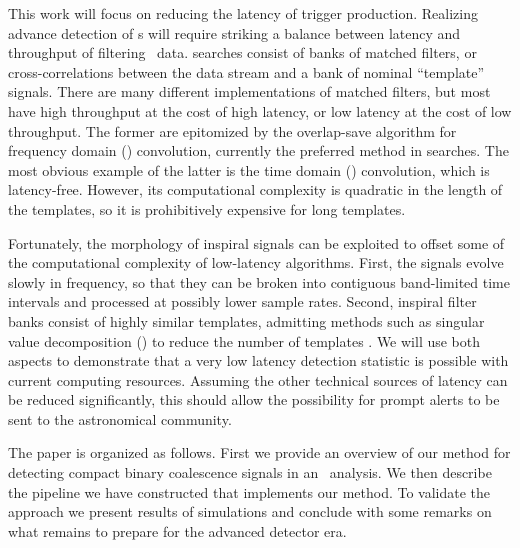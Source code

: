 This work will focus on reducing the latency of trigger production.  Realizing
advance detection of \CBC{}s will require striking a balance between latency
and throughput of filtering \GW\ data. \CBC{} searches consist of banks of
matched filters, or cross-correlations between the data stream and a bank of
nominal ``template'' signals.  There are many different implementations of
matched filters, but most have high throughput at the cost of high latency, or
low latency at the cost of low throughput.  The former are epitomized by the
overlap-save algorithm
for frequency domain (\FD) convolution, currently the preferred method in \GW{}
searches.  The most obvious example of the latter is the time domain (\TD)
convolution, which is latency-free.  However, its computational complexity is
quadratic in the length of the templates, so it is prohibitively expensive for
long templates.

Fortunately, the morphology of inspiral signals can be exploited to offset some
of the computational complexity of low-latency algorithms.  First, the signals
evolve slowly in frequency, so that they can be broken into contiguous
band-limited time intervals and processed at possibly lower sample rates.
Second, inspiral filter banks consist of highly similar templates, admitting
methods such as singular value decomposition (\SVD{}) to reduce the number of
templates \citep{Cannon:2010p10398}. We will use both aspects to demonstrate
that a very low latency detection statistic is possible with current computing
resources.  Assuming the other technical sources of latency can be reduced
significantly, this should allow the possibility for prompt alerts to be sent
to the astronomical community.

The paper is organized as follows. First we provide an overview of our method
for detecting compact binary coalescence signals in an \earlywarning\ analysis.
We then describe the pipeline we have constructed that implements our method.
To validate the approach we present results of simulations and conclude with
some remarks on what remains to prepare for the advanced detector era.

